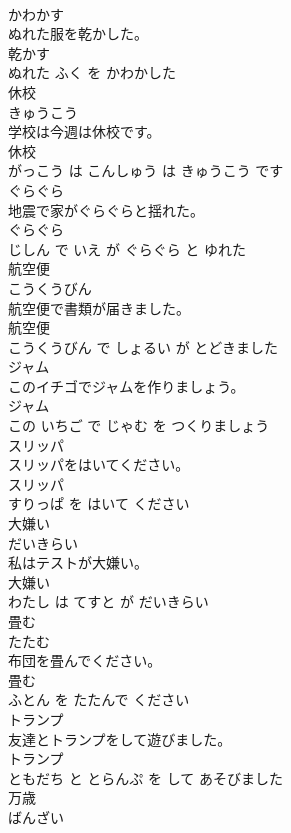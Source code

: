 \documentclass[8pt]{extreport}
\begin{document}
\begin{CJK}{UTF8}{min}
\\	かわかす			
\\	ぬれた服を乾かした。	
\\	乾かす 
\\	ぬれた ふく を かわかした			
\\	休校	
\\	きゅうこう			
\\	学校は今週は休校です。	
\\	休校 
\\	がっこう は こんしゅう は きゅうこう です			
\\	ぐらぐら	
\\	地震で家がぐらぐらと揺れた。	
\\	ぐらぐら 
\\	じしん で いえ が ぐらぐら と ゆれた			
\\	航空便	
\\	こうくうびん			
\\	航空便で書類が届きました。	
\\	航空便 
\\	こうくうびん で しょるい が とどきました			
\\	ジャム	
\\	このイチゴでジャムを作りましょう。	
\\	ジャム 
\\	この いちご で じゃむ を つくりましょう			
\\	スリッパ	
\\	スリッパをはいてください。	
\\	スリッパ 
\\	すりっぱ を はいて ください			
\\	大嫌い	
\\	だいきらい			
\\	私はテストが大嫌い。	
\\	大嫌い 
\\	わたし は てすと が だいきらい			
\\	畳む	
\\	たたむ			
\\	布団を畳んでください。	
\\	畳む 
\\	ふとん を たたんで ください			
\\	トランプ	
\\	友達とトランプをして遊びました。	
\\	トランプ 
\\	ともだち と とらんぷ を して あそびました			
\\	万歳	
\\	ばんざい			

\end{CJK}
\end{document}
